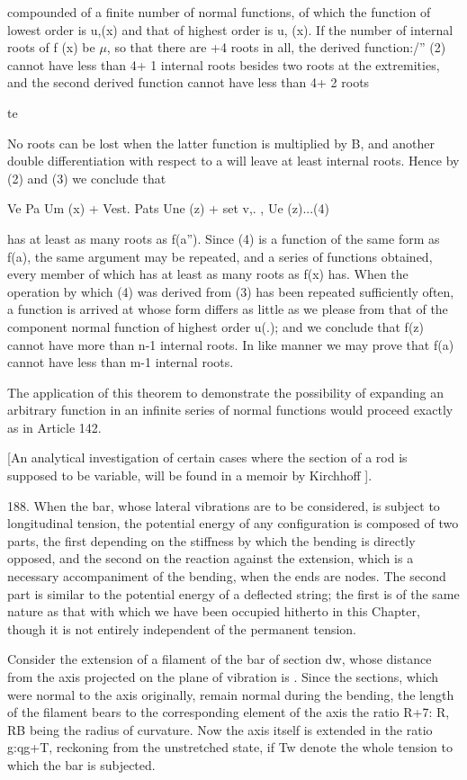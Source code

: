 compounded of a finite number of normal functions, of which the function
of lowest order is u,(x) and that of highest order is u, (x). If the
number of internal roots of f (x) be \(\mu\), so that there are +4 roots
in all, the derived function:/'' (2) cannot have less than 4+ 1 internal
roots besides two roots at the extremities, and the second derived
function cannot have less than 4+ 2 roots

te


No roots can be lost when the latter function is multiplied by B, and
another double differentiation with respect to a will leave at least
internal roots. Hence by (2) and (3) we conclude that

Ve Pa Um (x) + Vest. Pats Une (z) + set v,. , Ue (z)...(4)

has at least as many roots as f(a''). Since (4) is a function of the
same form as f(a), the same argument may be repeated, and a series of
functions obtained, every member of which has at least as many roots as
f(x) has. When the operation by which (4) was derived from (3) has been
repeated sufficiently often, a function is arrived at whose form differs
as little as we please from that of the component normal function of
highest order u(.); and we conclude that f(z) cannot have more than n-1
internal roots. In like manner we may prove that f(a) cannot have less
than m-1 internal roots.

The application of this theorem to demonstrate the possibility of
expanding an arbitrary function in an infinite series of normal
functions would proceed exactly as in Article 142.

[An analytical investigation of certain cases where the section
of a rod is supposed to be variable, will be found in a memoir by
Kirchhoff ].

188. When the bar, whose lateral vibrations are to be considered, is
subject to longitudinal tension, the potential energy of any
configuration is composed of two parts, the first depending on the
stiffness by which the bending is directly opposed, and the second on
the reaction against the extension, which is a necessary accompaniment
of the bending, when the ends are nodes. The second part is similar to
the potential energy of a deflected string; the first is of the same
nature as that with which we have been occupied hitherto in this
Chapter, though it is not entirely independent of the permanent tension.

Consider the extension of a filament of the bar of section dw, whose
distance from the axis projected on the plane of vibration is . Since
the sections, which were normal to the axis originally, remain normal
during the bending, the length of the filament bears to the
corresponding element of the axis the ratio R+7: R, RB being the radius
of curvature. Now the axis itself is extended in the ratio g:qg+T,
reckoning from the unstretched state, if Tw denote the whole tension to
which the bar is subjected.


